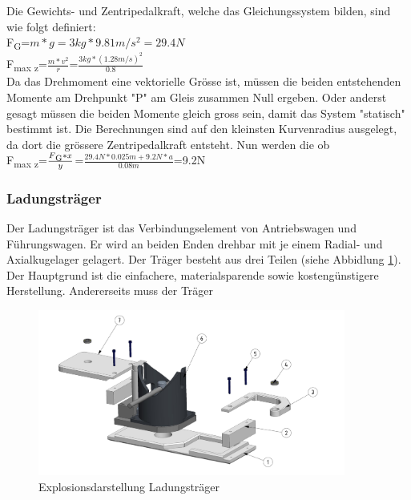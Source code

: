 \documentclass[../../main.tex]{subfiles}
\begin{document}
    Die Gewichts- und Zentripedalkraft, welche das Gleichungssystem bilden, sind wie folgt definiert:\\

    F\textsubscript{G}=\(m*g=3kg*9.81m/s^2=29.4N\)\\

    F\textsubscript{max z}=\(\frac{m*v^2}{r}\)=\(\frac{3kg*(1.28m/s)^2}{0.8}\)\\

    Da das Drehmoment eine vektorielle Grösse ist, müssen die beiden entstehenden Momente am Drehpunkt "P" am Gleis zusammen Null ergeben. Oder anderst gesagt müssen die beiden Momente gleich gross sein, damit das System "statisch" bestimmt ist. Die Berechnungen sind auf den kleinsten Kurvenradius ausgelegt, da dort die grössere Zentripedalkraft entsteht. Nun werden die ob\\

    F\textsubscript{max z}=\(\frac{F\textsubscript{G}*x}{y}\)=\(\frac{29.4N*0.025m+9.2N*a}{0.08m}\)=9.2N\\

    \subsubsection{Ladungsträger}
    Der Ladungsträger ist das Verbindungselement von Antriebswagen und Führungswagen. Er wird an beiden Enden drehbar mit je einem Radial- und Axialkugelager gelagert. Der Träger besteht aus drei Teilen (siehe Abbidlung \ref{fig:expl_ladungstraeger}). Der Hauptgrund ist die einfachere, materialsparende sowie kostengünstigere Herstellung. Andererseits muss der Träger \\


    \begin{figure}[H] %
        \centering
        \includegraphics[width=0.9\textwidth]{ladungstraeger.png}
        \caption{Explosionsdarstellung Ladungsträger}
        \label{fig:expl_ladungstraeger}
    \end{figure}
\end{document}
